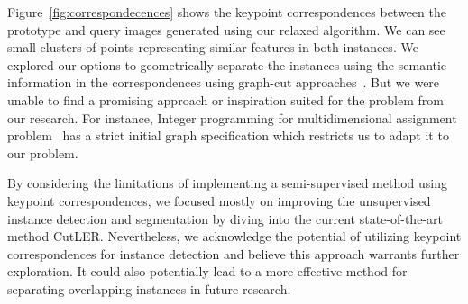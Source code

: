 Figure~\ref{fig:correspondecences} shows the keypoint correspondences between the prototype and query images generated using our relaxed algorithm. We can see small clusters of points representing similar features in both instances. We explored our options to geometrically separate the instances using the semantic information in the correspondences using graph-cut approaches~\cite{wang2022tokencut, sarlin2020supergluelearningfeaturematching}. But we were unable to find a promising approach or inspiration suited for the problem from our research. For instance, Integer programming for multidimensional assignment problem~\cite{WALTEROS2014553} has a strict initial graph specification which restricts us to adapt it to our problem.

By considering the limitations of implementing a semi-supervised method using keypoint correspondences, we focused mostly on improving the unsupervised instance detection and segmentation by diving into the current state-of-the-art method CutLER. Nevertheless, we acknowledge the potential of utilizing keypoint correspondences for instance detection and believe this approach warrants further exploration. It could also potentially lead to a more effective method for separating overlapping instances in future research.



